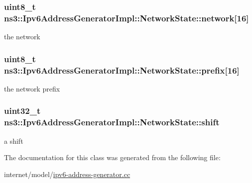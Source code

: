 \subsubsection[{\texorpdfstring{network}{network}}]{\setlength{\rightskip}{0pt plus 5cm}uint8\+\_\+t ns3\+::\+Ipv6\+Address\+Generator\+Impl\+::\+Network\+State\+::network\mbox{[}16\mbox{]}}\hypertarget{classns3_1_1Ipv6AddressGeneratorImpl_1_1NetworkState_ac84710d199384c02e953fd604fe34cee}{}\label{classns3_1_1Ipv6AddressGeneratorImpl_1_1NetworkState_ac84710d199384c02e953fd604fe34cee}


the network 

\subsubsection[{\texorpdfstring{prefix}{prefix}}]{\setlength{\rightskip}{0pt plus 5cm}uint8\+\_\+t ns3\+::\+Ipv6\+Address\+Generator\+Impl\+::\+Network\+State\+::prefix\mbox{[}16\mbox{]}}\hypertarget{classns3_1_1Ipv6AddressGeneratorImpl_1_1NetworkState_adf79c5bbb85a39bf26bf94f5cfd30b0b}{}\label{classns3_1_1Ipv6AddressGeneratorImpl_1_1NetworkState_adf79c5bbb85a39bf26bf94f5cfd30b0b}


the network prefix 

\subsubsection[{\texorpdfstring{shift}{shift}}]{\setlength{\rightskip}{0pt plus 5cm}uint32\+\_\+t ns3\+::\+Ipv6\+Address\+Generator\+Impl\+::\+Network\+State\+::shift}\hypertarget{classns3_1_1Ipv6AddressGeneratorImpl_1_1NetworkState_a959c55b3a4900a71975f7f5ea3b2d859}{}\label{classns3_1_1Ipv6AddressGeneratorImpl_1_1NetworkState_a959c55b3a4900a71975f7f5ea3b2d859}


a shift 



The documentation for this class was generated from the following file\+:\begin{DoxyCompactItemize}
\item 
internet/model/\hyperlink{ipv6-address-generator_8cc}{ipv6-\/address-\/generator.\+cc}\end{DoxyCompactItemize}
